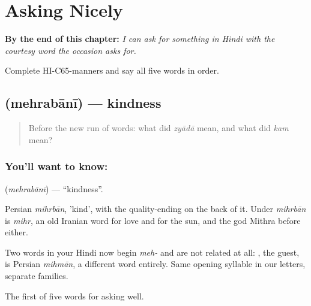 
\chapter{Asking Nicely}
\label{ch:hi-asking-nicely}

\begin{chapteropening}
\textbf{By the end of this chapter:} \emph{I can ask for something in Hindi with the courtesy word the occasion asks for.}

Complete HI-C65-manners and say all five words in order.
\end{chapteropening}

\section[\texorpdfstring{\hi{मेहरबानी} (mehrabānī)}{मेहरबानी (mehrabānī)}]{ (mehrabānī) — kindness}

\label{lesson:HI-C65-kindness}



\begin{quote}
Before the new run of words: what did \emph{zyādā} mean, and what did \emph{kam} mean?
\end{quote}

\subsection*{You'll want to know: }
\textbf{} (\emph{mehrabānī}) — \textquotedblleft{}kindness\textquotedblright{}.

Persian \emph{mihrbān}, 'kind', with the quality-ending on the back of it. Under \emph{mihrbān} is \emph{mihr}, an old Iranian word for love and for the sun, and the god Mithra before either.

Two words in your Hindi now begin \emph{meh-} and are not related at all: , the guest, is Persian \emph{mihmān}, a different word entirely. Same opening syllable in our letters, separate families.

\begin{grammarlens}[title={What you've built}]
The first of five words for asking well.
\end{grammarlens}

